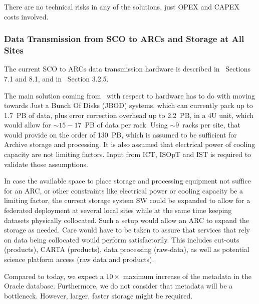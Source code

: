There are no technical risks in any of the solutions, just OPEX and CAPEX costs involved.


\subsubsection{Data Transmission from SCO to ARCs and Storage at All Sites} %
\label{ssub:data_transmission_from_sco_to_arcs_and_storage_at_all_sites}

The current SCO to ARCs data transmission hardware is described in~\cite{dtas} Sections 7.1 and 8.1, and in~\cite{CSA-IA} Section 3.2.5.

The main solution coming from~\cite{dtas} with respect to hardware has to do with moving towards Just a Bunch Of Disks (JBOD) systems, which can currently pack up to 1.7~PB of data, plus error correction overhead up to 2.2~PB, in a 4U unit, which would allow for $\sim 15-17$~PB of data per rack. Using $\sim 9$~racks per site, that would provide on the order of 130~PB, which is assumed to be sufficient for Archive storage and processing. It is also assumed that electrical power of cooling capacity are not limiting factors. Input from ICT, ISOpT and IST is required to validate those assumptions.

In case the available space to place storage and processing equipment not suffice for an ARC, or other constraints like electrical power or cooling capacity be a limiting factor, the current storage system SW could be expanded to allow for a federated deployment at several local sites while at the same time keeping datasets physically collocated. Such a setup would allow an ARC to expand the storage as needed. Care would have to be taken to assure that services that rely on data being collocated would perform satisfactorily. This includes cut-outs (products), CARTA (products), data processing (raw-data), as well as potential science platform access (raw data and products).

Compared to today, we expect a $10\times$ maximum increase of the metadata in the Oracle database. Furthermore, we do not consider that metadata will be a bottleneck. However, larger, faster storage might be required.

